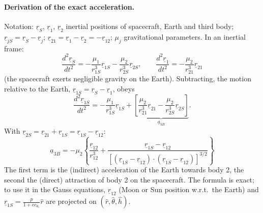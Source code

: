 \paragraph{Derivation of the exact acceleration.} Notation: $\underline r_S$, $\underline r_1$, $\underline r_2$ inertial positions of spacecraft,
Earth and third body; $\underline r_{jS}=\underline r_S-\underline r_j$; $\underline r_{21}=\underline r_1-\underline r_2=-\underline r_{12}$;
$\mu_j$ gravitational parameters. In an inertial frame:
\begin{equation}
\frac{d^{2}\underline{r}_{S}}{dt^{2}}=-\frac{\mu_{1}}{r_{1S}^{3}}\underline{r}_{1S}-\frac{\mu_{2}}{r_{2S}^{3}}\underline{r}_{2S},
\qquad
\frac{d^{2}\underline{r}_{1}}{dt^{2}}=-\frac{\mu_{2}}{r_{21}^{3}}\underline{r}_{21}
\end{equation}
(the spacecraft exerts negligible gravity on the Earth). Subtracting, the motion relative to the Earth, $\underline r_{1S}=\underline r_S-\underline r_1$, obeys
\begin{equation}
\frac{d^{2}\underline{r}_{1S}}{dt^{2}}=-\frac{\mu_{1}}{r_{1S}^{3}}\underline{r}_{1S}
+\underbrace{\left[\frac{\mu_{2}}{r_{21}^{3}}\underline{r}_{21}-\frac{\mu_{2}}{r_{2S}^{3}}\underline{r}_{2S}\right]}_{\underline a_{3B}} .
\end{equation}
With $\underline r_{2S}=\underline r_{21}+\underline r_{1S}=\underline r_{1S}-\underline r_{12}$:
\begin{equation}
\boxed{\;\underline{a}_{3B}=-\mu_{2}\left\{\frac{\underline{r}_{12}}{r_{12}^{3}}
+\frac{\underline{r}_{1S}-\underline{r}_{12}}{\left[(\underline{r}_{1S}-\underline{r}_{12})\cdot(\underline{r}_{1S}-\underline{r}_{12})\right]^{3/2}}\right\}\;}
\end{equation}
The first term is the (indirect) acceleration of the Earth towards body 2, the second the (direct) attraction of body 2 on the
spacecraft. The formula is exact; to use it in the Gauss equations, $\underline r_{12}$ (Moon or Sun position w.r.t.\ the Earth) and
$\underline r_{1S}=\frac{p}{1+ec_{\theta_*}}\hat r$ are projected on $(\hat r,\hat\theta,\hat h)$.

